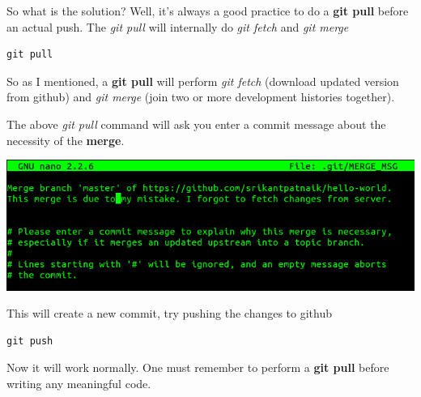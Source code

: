 \documentclass[letterpaper,10pt,english]{sphinxmanual}
\begin{document}
\begin{enumerate}
So what is the solution?
Well, it's always a good practice to do a \textbf{git pull} before an actual
push. The \emph{git pull} will internally do \emph{git fetch} and \emph{git merge}

\begin{Verbatim}[commandchars=\\\{\}]
git pull
\end{Verbatim}

So as I mentioned, a \textbf{git pull}  will perform \emph{git fetch} (download
updated version from github) and \emph{git merge} (join two or more development
histories together).

The above \emph{git pull} command will ask you enter a commit message about
the necessity of the \textbf{merge}.

\includegraphics[width=1.000\linewidth]{git-merge.png}

\begin{DUlineblock}{0em}
\item[] 
\end{DUlineblock}

This will create a new commit, try pushing the changes to github

\begin{Verbatim}[commandchars=\\\{\}]
git push
\end{Verbatim}

Now it will work normally. One must remember to perform
a \textbf{git pull} before writing any meaningful code.

\end{enumerate}

\begin{DUlineblock}{0em}
\item[] 
\item[] 
\item[] 
\item[] 
\item[] 
\item[] 
\item[] 
\end{DUlineblock}
\end{document}

